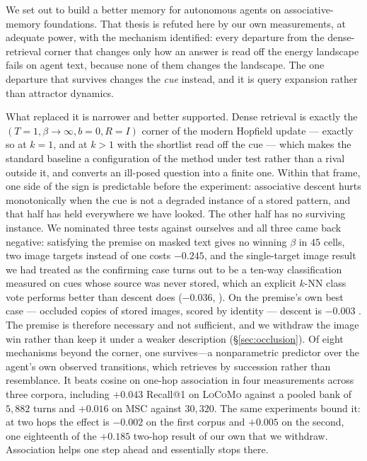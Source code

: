 \label{sec:conclusion}

We set out to build a better memory for autonomous agents on associative-memory foundations.
That thesis is refuted here by our own measurements, at adequate power, with the mechanism
identified: every departure from the dense-retrieval corner that changes only how an answer
is read off the energy landscape fails on agent text, because none of them changes the
landscape. The one departure that survives changes the \emph{cue} instead, and it is query
expansion rather than attractor dynamics.

What replaced it is narrower and better supported. Dense retrieval is exactly the
$(T{=}1,\beta\!\to\!\infty,b{=}0,R{=}I)$ corner of the modern Hopfield update --- exactly
so at $k{=}1$, and at $k>1$ with the shortlist read off the cue --- which makes
the standard baseline a configuration of the method under test rather than a rival outside
it, and converts an ill-posed question into a finite one. Within that frame, one side of
the sign is predictable before the experiment: associative descent hurts monotonically when
the cue is not a degraded instance of a stored pattern, and that half has held everywhere
we have looked. The other half has no surviving instance. We nominated three tests against
ourselves and all three came back negative: satisfying the premise on masked text gives no
winning $\beta$ in $45$ cells, two image targets instead of one costs $-0.245$, and the
single-target image result we had treated as the confirming case turns out to be a ten-way
classification measured on cues whose source was never stored, which an explicit $k$-NN
class vote performs better than descent does ($-0.036$, ). On the
premise's own best case --- occluded copies of stored images, scored by identity --- descent
is $-0.003$ . The premise is therefore necessary and not sufficient, and
we withdraw the image win rather than keep it under a weaker description
(\S\ref{sec:occlusion}). Of eight mechanisms beyond the corner, one survives---a
nonparametric predictor over the agent's own observed transitions, which retrieves by
succession rather than resemblance. It beats cosine on one-hop association in four
measurements across three corpora, including $+0.043$ Recall@1  on
\textsc{LoCoMo} against a pooled bank of $5{,}882$ turns and $+0.016$ 
on \textsc{MSC} against $30{,}320$. The same experiments bound it: at two hops the effect is
$-0.002$ on the first corpus and $+0.005$ on the second, one eighteenth of the $+0.185$
two-hop result of our own that we withdraw. Association helps one step ahead and essentially
stops there.

